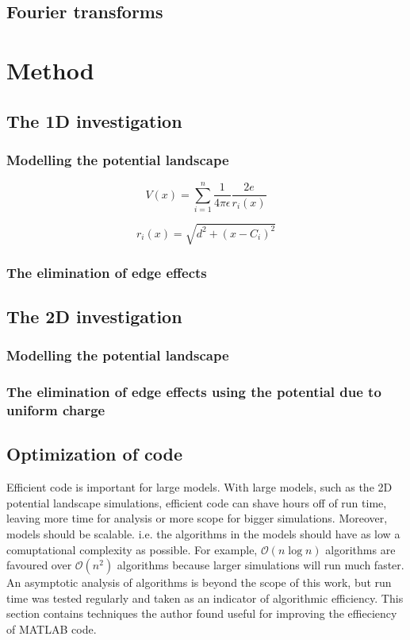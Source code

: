 \message{ !name(report.tex)}\documentclass[]{article}
\begin{document}
\subsection{Fourier transforms}

\section{Method}

\subsection{The 1D investigation}

\subsubsection{Modelling the potential landscape}
\begin{equation}\label{poteq}
V(x) = \sum_{i=1}^n \frac{1}{4\pi\epsilon}\frac{2e}{r_i(x)}
\end{equation}

\begin{equation}
r_i(x) = \sqrt{d^2 + (x-C_i)^2}
\end{equation}

\subsubsection{The elimination of edge effects}

\subsection{The 2D investigation}

\subsubsection{Modelling the potential landscape}

\subsubsection{The elimination of edge effects using the potential due to uniform charge}

\subsection{Optimization of code}
Efficient code is important for large models. With large models, such as the 2D potential landscape simulations, efficient code can shave hours off of run time, leaving more time for analysis or more scope for bigger simulations. Moreover, models should be scalable. i.e. the algorithms in the models should have as low a comuptational complexity as possible. For example, $\mathcal{O}(n\log n)$ algorithms are favoured over $\mathcal{O}(n^2)$ algorithms because larger simulations will run much faster. An asymptotic analysis of algorithms is beyond the scope of this work, but run time was tested regularly and taken as an indicator of algorithmic efficiency. This section contains techniques the author found useful for improving the effieciency of MATLAB code.
\end{document}
